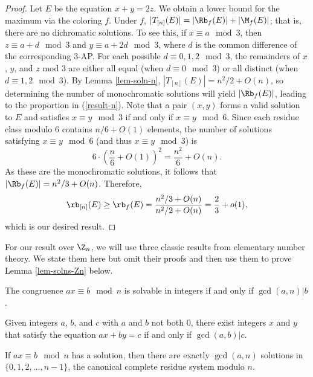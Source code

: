 \begin{proof}
Let $E$ be the equation $x+y = 2z$. We obtain a lower bound for the maximum via the coloring $f$. Under $f$, $|T_{[n]}(E)| = |\Rb_{f}(E)| + |\M_{f}(E)|$; that is, there are no dichromatic solutions. To see this, if $x \equiv a \mod 3$, then $z \equiv a + d \mod 3$ and $y \equiv a + 2d \mod 3$, where $d$  is the common difference of the corresponding $3$-AP. For each possible $d \equiv 0, 1, 2 \mod 3$, 
the remainders of $x$, $y$, and $z$ mod $3$ are either all equal (when $d \equiv 0 \mod 3$) or all distinct (when $d \equiv 1, 2 \mod 3$). 
By Lemma \ref{lem-soln-n}, $|T_{[n]}(E)| = n^2/2 + O(n)$, so determining the number of monochromatic solutions will yield $|\Rb_{f}(E)|$, leading to the proportion in (\ref{result-n}). Note that a pair $(x, y)$ forms 
a valid solution to $E$ and satisfies $x \equiv y \mod 3$ if and only if $x \equiv y \mod 6$. Since each residue class modulo 6 contains $n/6 + O(1)$ elements, the number of solutions satisfying $x \equiv y \mod 6$ (and thus $x \equiv y \mod 3$) is 
\[6 \cdot \left(\frac{n}{6} + O(1)\right)^2 = \frac{n^2}{6} + O(n).\] 
As these are the monochromatic solutions, it follows that $|\Rb_{f}(E)| = n^2/3 + O(n)$. Therefore, \begin{align}
    \rb_{[n]}(E) \geq \displaystyle \rb_{f}(E) = \frac{n^2/3 + O(n)}{n^2/2 + O(n)} = \frac{2}{3} + o(1),
\end{align} which is our desired result.
\end{proof}

For our result over $\Z_n$, we will use three classic results from elementary number theory.
We state them here but omit their proofs and then use them to prove Lemma \ref{lem-solns-Zn} below.

\begin{theorem}\label{thm-nt-1}
The congruence $ax \equiv b \mod{n}$ is solvable in integers if and only if $\gcd(a,n)|b$.
\end{theorem}

\begin{theorem}\label{thm-nt-2}
    Given integers $a$, $b$, and $c$ with $a$ and $b$ not both $0$, there exist integers $x$ and $y$ that satisfy the equation $ax + by  = c$ if and only if $\gcd(a,b)|c$.
\end{theorem}

\begin{theorem}\label{thm-nt-3}
If $ax \equiv b \mod{n}$ has a solution, then there are exactly $\gcd(a,n)$ solutions in $\{0, 1, 2, \ldots, n - 1\}$, the canonical complete residue system modulo $n$.
\end{theorem}

